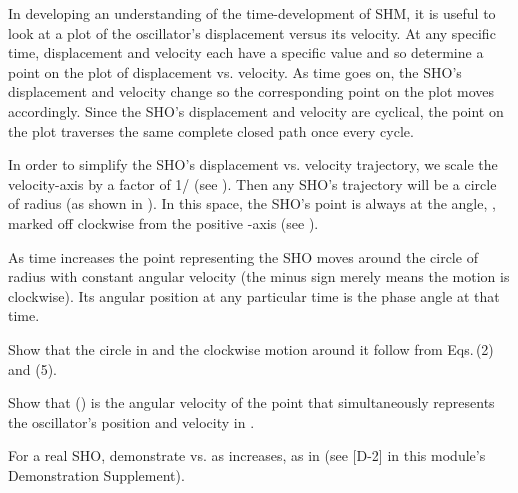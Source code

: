 {\newpage


\newpage

In developing an understanding of the time-development of SHM, it is useful
to look at a plot of the oscillator's displacement versus its velocity.
At any specific time, displacement and velocity each have a specific value
and so determine a point on the plot of displacement vs. velocity.
As time goes on, the SHO's displacement and velocity change so the
corresponding point on the plot moves accordingly.
Since the SHO's displacement and velocity are cyclical, the point on the plot
traverses the same complete closed path once every cycle.

In order to simplify the SHO's displacement vs. velocity trajectory, we scale
the velocity-axis by a factor of 1/\m{\omega} (see ).
Then any SHO's trajectory will be a circle of radius  (as shown in ).
In this space, the SHO's point is always at the  angle, \m{\delta},
marked off clockwise from the positive -axis (see ).

As time increases the point representing the SHO moves around the circle
of radius  with constant angular velocity \m{-\,\omega} (the minus sign
merely means the motion is clockwise).
Its angular position at any particular time is the phase angle at that time.

\tryit Show that the circle in  and the clockwise motion around it
follow from Eqs.\,(2) and (5). 

\tryit Show that (\m{- \omega}) is the angular velocity of the point that
simultaneously represents the oscillator's position and velocity in
. 

\tryit For a real SHO, demonstrate  vs.  as 
increases, as in  (see [D-2] in this module's Demonstration Supplement).
}%
%
\newpage

